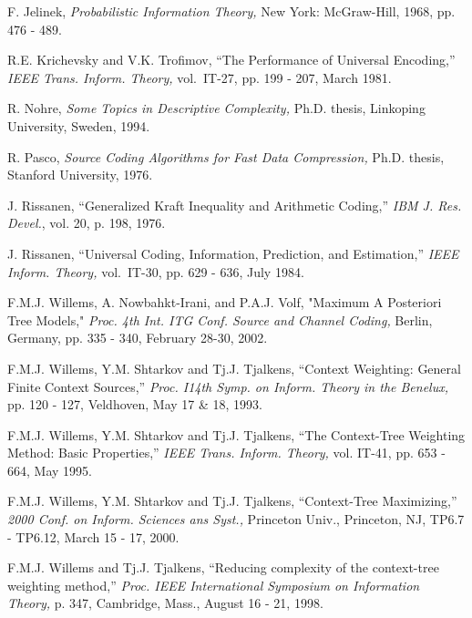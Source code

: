 \documentclass[10pt,conference]{IEEEtran}
\begin{document}
\begin{thebibliography}{1}
 F. Jelinek, {\em Probabilistic Information Theory,} New York: McGraw-Hill, 1968, pp. 476 - 489.

 R.E. Krichevsky and V.K. Trofimov, ``The Performance of Universal Encoding,'' {\em IEEE Trans. Inform. Theory,} vol.~IT-27, pp. 199 - 207, March 1981.

 R. Nohre, {\em Some Topics in Descriptive Complexity,} Ph.D. thesis, Linkoping University, Sweden, 1994.

 R. Pasco, {\em Source Coding Algorithms for Fast Data Compression,} Ph.D. thesis, Stanford University, 1976.

 J. Rissanen, ``Generalized Kraft Inequality and Arithmetic Coding,'' {\em IBM J. Res. Devel.}, vol. 20, p. 198, 1976.

 J. Rissanen, ``Universal Coding, Information, Prediction, and Estimation,'' {\em IEEE Inform. Theory,} vol.~IT-30, pp. 629 - 636, July 1984.

 F.M.J. Willems, A. Nowbahkt-Irani, and P.A.J. Volf, "Maximum A Posteriori Tree Models," {\em Proc. 4th Int. ITG Conf. Source and Channel Coding,} Berlin, Germany, pp. 335 - 340, February 28-30, 2002.

 F.M.J. Willems, Y.M. Shtarkov and Tj.J. Tjalkens, ``Context Weighting: General Finite Context Sources,'' {\em Proc. I14th Symp. on Inform. Theory in the Benelux,} pp. 120 - 127, Veldhoven, May 17 \& 18, 1993.

 F.M.J. Willems, Y.M. Shtarkov and Tj.J. Tjalkens, ``The Context-Tree Weighting Method: Basic Properties,'' {\em IEEE Trans. Inform. Theory,} vol. IT-41, pp. 653 - 664, May 1995.

 F.M.J. Willems, Y.M. Shtarkov and Tj.J. Tjalkens, ``Context-Tree Maximizing,'' {\em 2000 Conf. on Inform. Sciences ans Syst.,} Princeton Univ., Princeton, NJ, TP6.7 - TP6.12, March 15 - 17, 2000.

 F.M.J. Willems and Tj.J. Tjalkens, ``Reducing complexity of the context-tree weighting method,'' {\em Proc. IEEE International Symposium on Information Theory,} p. 347, Cambridge, Mass., August 16 - 21, 1998.
\end{thebibliography}
\end{document}
